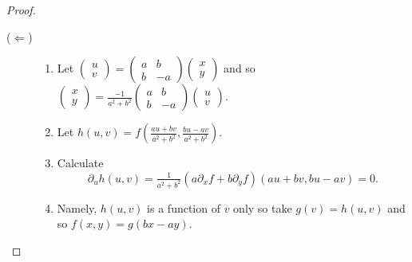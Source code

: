 \begin{proof}
\begin{description}
        \item[(\(\Leftarrow\))]
              \begin{enumerate}
                  \item Let \(\left(\begin{smallmatrix}
                                u\\ v
                            \end{smallmatrix}\right)
                        = \left(\begin{smallmatrix}
                                a & b \\ b & -a
                            \end{smallmatrix}\right)
                        \left(\begin{smallmatrix}
                                x \\ y
                            \end{smallmatrix}\right)\)
                        and so
                        \(\left(\begin{smallmatrix}
                                x\\ y
                            \end{smallmatrix}\right)
                        = \frac{-1}{a^2 + b^2} \left(\begin{smallmatrix}
                                a & b \\ b & -a
                            \end{smallmatrix}\right)
                        \left(\begin{smallmatrix}
                                u \\ v
                            \end{smallmatrix}\right)\).
                  \item Let \(h(u,v)=f(\frac{au + bv}{a^2 + b^2}, \frac{bu-av}{a^2+b^2})\).
                  \item Calculate
                        \[
                            \partial_u h(u,v)
                            = \tfrac{1}{{a^2 + b^2}}
                            \left( a \partial_x f
                            + b \partial_y f \right)  (au + bv, bu-av) = 0.
                        \]
                  \item Namely, \(h(u,v)\) is a function of \(v\) only so take \(g(v) = h(u,v)\) and so \(f(x,y) = g(bx-ay)\).
              \end{enumerate}
    \end{description}

\end{proof}





